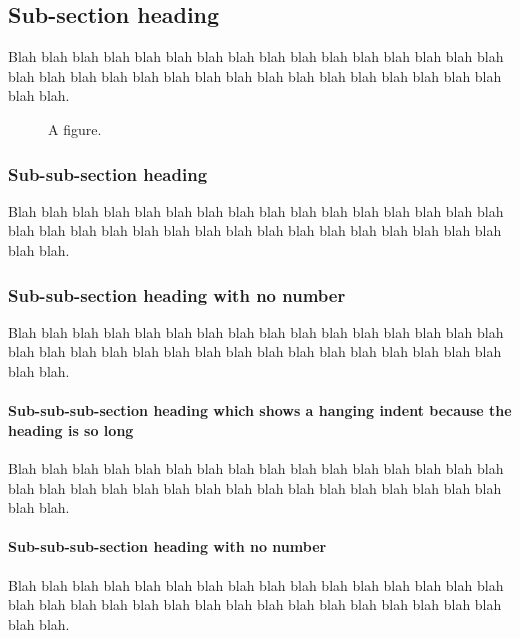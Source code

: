 \documentclass[rd,pdfa]{drdc-report}
\begin{document}
\subsection{Sub-section heading}
Blah blah blah blah blah blah blah blah blah blah blah blah blah blah
blah blah blah blah blah blah blah blah blah blah blah blah blah blah
blah blah blah blah blah blah.

\begin{figure}[t]
 \begin{center}\end{center}
 \caption{A figure.}
\end{figure}

\subsubsection{Sub-sub-section heading}

Blah blah blah blah blah blah blah blah blah blah blah blah blah blah
blah blah blah blah blah blah blah blah blah blah blah blah blah blah
blah blah blah blah blah blah.

\subsubsection*{Sub-sub-section heading with no number}

Blah blah blah blah blah blah blah blah blah blah blah blah blah blah
blah blah blah blah blah blah blah blah blah blah blah blah blah blah
blah blah blah blah blah blah.

\paragraph{Sub-sub-sub-section heading which shows a hanging indent
because the heading is so long}

Blah blah blah blah blah blah blah blah blah blah blah blah blah blah
blah blah blah blah blah blah blah blah blah blah blah blah blah blah
blah blah blah blah blah blah.

 \paragraph*{Sub-sub-sub-section heading with no number}
Blah blah blah blah blah blah blah blah blah blah blah blah blah blah
blah blah blah blah blah blah blah blah blah blah blah blah blah blah
blah blah blah blah blah blah.
\end{document}
